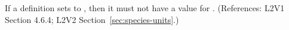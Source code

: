 If a \Species definition sets  to
, then it must not have a value for .
(References: L2V1 Section 4.6.4; L2V2 Section~\ref{sec:species-units}.)
